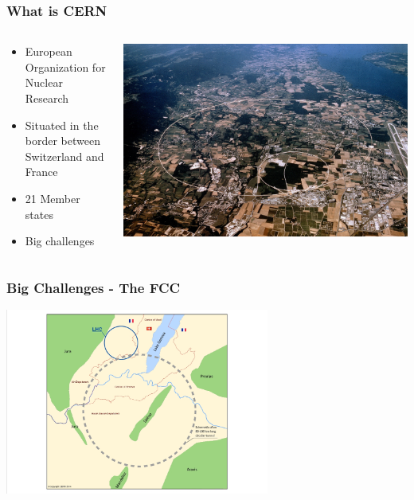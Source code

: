 \documentclass[aspectratio=169]{beamer}
\begin{document}
\begin{frame}

    \frametitle{What is CERN}
    \begin{minipage}[t]{0.95\textwidth}
        \begin{columns}
            \begin{column}{0.5\textwidth}
                \begin{itemize}
                    \item European Organization for Nuclear Research
                    \item Situated in the border between Switzerland and France
                    \item 21 Member states
                    \item Big challenges 
                \end{itemize}
            \end{column}
            \begin{column}{0.5\textwidth}
                \includegraphics[width=1.1\textwidth]{CernMap.jpg}
            \end{column}
        \end{columns}
    \end{minipage}

\end{frame}


\begin{frame}
    \frametitle{Big Challenges - The FCC}
    \begin{center}
        \includegraphics[width=0.65\textwidth,trim=4 4 4 4,clip]{CERN_LCC.jpg}
    \end{center}
\end{frame}
\end{document}
